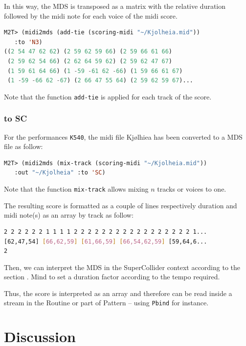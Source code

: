 \smallskip

In this way, the MDS is transposed as a matrix with the relative duration followed by the midi note for each voice of the midi score. 

\begin{lstlisting}[language=Lisp]
M2T> (midi2mds (add-tie (scoring-midi "~/Kjolheia.mid")) 
   :to 'N3)
((2 54 47 62 62) (2 59 62 59 66) (2 59 66 61 66) 
 (2 59 62 54 66) (2 62 64 59 62) (2 59 62 47 67) 
 (1 59 61 64 66) (1 -59 -61 62 -66) (1 59 66 61 67) 
 (1 -59 -66 62 -67) (2 66 47 55 64) (2 59 62 59 67)...
\end{lstlisting}

Note that the function \texttt{add-tie} is applied for each track of the score.


\subsubsection{to SC}

For the performances \texttt{K540}, the midi file Kj{\o}lhiea has been converted to a MDS file as follow:
\begin{lstlisting}[language=Lisp]
M2T> (midi2mds (mix-track (scoring-midi "~/Kjolheia.mid")) 
   :out "~/Kjolheia" :to 'SC)
\end{lstlisting}

Note that the function \texttt{mix-track} allows mixing $n$ tracks or voices to one.
\newpage

The resulting score is formatted as a couple of lines respectively duration and midi note(s) as an array by track as follow:

\begin{lstlisting}[language=bash]
2 2 2 2 2 2 1 1 1 1 2 2 2 2 2 2 2 2 2 2 2 2 2 2 2 2 2 1...
[62,47,54] [66,62,59] [61,66,59] [66,54,62,59] [59,64,6...
2
\end{lstlisting}

\smallskip

Then, we can interpret the MDS in the SuperCollider context according to the section . Mind to set a duration factor according to the tempo required.

\smallskip

Thus, the score is interpreted as an array and therefore can be read inside a stream in the Routine or part of Pattern -- using \texttt{Pbind} for instance.


\section{Discussion}

